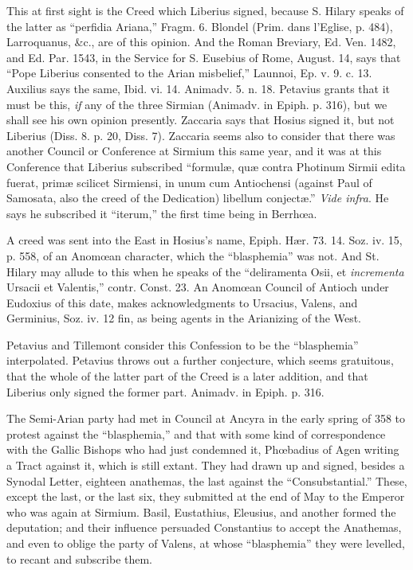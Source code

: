 This at first sight is the Creed which Liberius signed, because S.
Hilary speaks of the latter as ``perfidia Ariana,'' Fragm. 6.
Blondel (Prim. dans l'Eglise, p. 484), Larroquanus, \&c., are of
this opinion. And the Roman Breviary, Ed. Ven. 1482, and Ed. Par.
1543, in the Service for S. Eusebius of Rome, August. 14, says that
``Pope Liberius consented to the Arian misbelief,'' Launnoi,
Ep. v. 9. c. 13. Auxilius says the same, Ibid. vi. 14. Animadv. 5. n.
18. Petavius grants that it must be this, \emph{if} any of the three
Sirmian (Animadv. in Epiph. p. 316), but we shall see his own opinion
presently. Zaccaria says that Hosius signed it, but not Liberius (Diss.
8. p. 20, Diss. 7). Zaccaria seems also to consider that there was
another Council or Conference at Sirmium this same year, and it was at
this Conference that Liberius subscribed ``formulæ, quæ contra
Photinum Sirmii edita fuerat, primæ scilicet Sirmiensi, in unum cum
Antiochensi (against Paul of Samosata, also the creed of the
Dedication) libellum conjectæ.'' \emph{Vide infra}. He says he
subscribed it ``iterum,'' the first time being in Berrhœa.


A creed was sent into the East in Hosius's name, Epiph. Hær. 73.
14. Soz. iv. 15, p. 558, of an Anomœan character, which the ``blasphemia''
was not. And St. Hilary may allude to this when he speaks of the
``deliramenta Osii, et \emph{incrementa} Ursacii et Valentis,''
contr. Const. 23. An Anomœan Council of Antioch under Eudoxius
of this date, makes acknowledgments to Ursacius, Valens, and Germinius,
Soz. iv. 12 fin, as being agents in the Arianizing of the West.

Petavius and Tillemont consider this Confession to be the ``blasphemia''
interpolated. Petavius throws out a further conjecture, which seems
gratuitous, that the whole of the latter part of the Creed is a later
addition, and that Liberius only signed the former part. Animadv. in
Epiph. p. 316.


The Semi-Arian party had met in Council at Ancyra in the early
spring of 358 to protest against the ``blasphemia,'' and that
with some kind of correspondence with the Gallic Bishops who had just
condemned it, Phœbadius of Agen writing a Tract against it, which is
still extant. They had drawn up and signed, besides a Synodal Letter,
eighteen anathemas, the last against the ``Consubstantial.''
These, except the last, or the last six, they submitted at the end of
May to the Emperor who was again at Sirmium. Basil, Eustathius,
Eleusius, and another formed the deputation; and their influence
persuaded Constantius to accept the Anathemas, and even to oblige the
party of Valens, at whose ``blasphemia'' they were levelled,
to recant and subscribe them.

